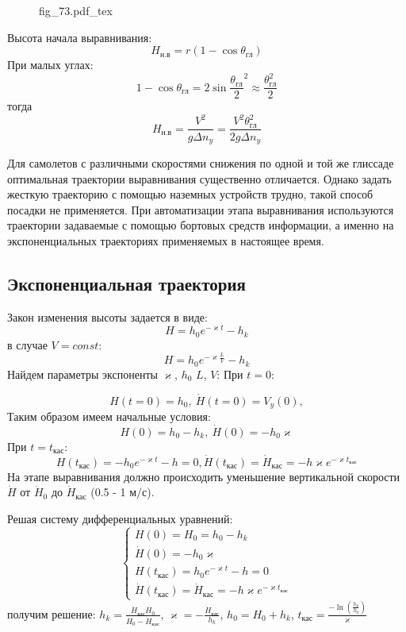 \documentclass{article}
\begin{document}
\begin{figure}[H]
	\centering
	{fig_73.pdf_tex}
\end{figure}


Высота начала выравнивания:
\[
	H_{н.в}    = r (1 - \cos{\theta_{гл}})
\]
При малых углах:
\[
	1 - \cos{\theta_{гл}}= 2 \sin{\frac{\theta_{гл}}{2}}^2 \approx
	\frac{\theta_{гл}^2}{ 2}
\]
тогда
\[
	H_{н.в} = \frac{V^2}{g \Delta n_y} =\frac{V^2 \theta_{гл}^2}{2g \Delta n_y}
\]

Для самолетов с различными скоростями снижения по одной и той же глиссаде
оптимальная траектории выравнивания существенно отличается. Однако задать
жесткую траекторию с помощью наземных устройств трудно, такой способ посадки не
применяется. При автоматизации этапа выравнивания используются траектории
задаваемые с помощью бортовых средств информации, а именно на экспоненциальных
траекториях применяемых в настоящее время.

\subsection{Экспоненциальная траектория}
Закон изменения высоты задается в виде:
\[
	H = h_0 e^{-\varkappa t } - h_k
\]
в случае $V = const$:
\[
	H = h_0 e^{-\varkappa \frac{L}{V}} - h_k
\]
Найдем параметры экспоненты $\varkappa$, $h_0$ $L$, $V$:
При $t = 0$:

\[
	H(t=0) = h_0, \ \dot{H}(t = 0) =  V_y (0),
\]
Таким образом имеем начальные условия:
\[
	H(0) = h_0 - h_{k},\ \dot{H}(0) = -h_0 \varkappa
\]
При $t = t_{кас}$:
\[
	H(t_{кас}) = - h_0 e^{-\varkappa t} - h = 0, \dot{H}(t_{кас}) =
	\dot{H}_{кас} = - h \varkappa e^{- \varkappa t_{кас}}
\]
На этапе выравнивания должно происходить уменьшение вертикальной скорости
$\dot{H}$ от $\dot{H}_0$ до $\dot{H}_{кас}$ (0.5 - 1 $м/с$).

Решая систему дифференциальных уравнений:
\begin{equation}
	\begin{cases}
		H(0) = H_0 = h_0 - h_k                    \\
		\dot{H}(0) = - h_0 \varkappa              \\
		H(t_{кас}) = h_0 e^{-\varkappa t} - h = 0 \\
		\dot{H}(t_{кас}) = \dot{H}_{кас} = -h \varkappa e^{-\varkappa t_{кас}}
	\end{cases}
\end{equation}
получим решение:
$h_k = \frac{\dot{H}_{кас} H_0}{\dot{H}_0 - \dot{H}_{кас}}$, $\varkappa = -
	\frac{\dot{H}_{кас}}{h_k}$, $h_0 = H_0 + h_k$, $t_{кас} = \frac{-
		\ln(\frac{h_k}{h_0})}{\varkappa}$
\end{document}
